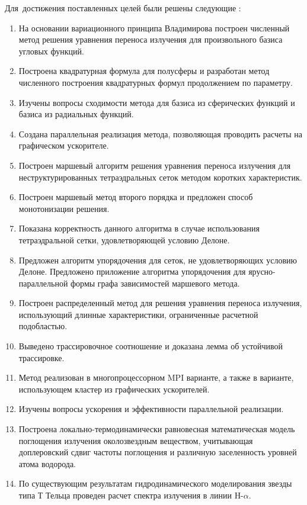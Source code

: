 Для~достижения поставленных целей были решены следующие {\tasks}:
\begin{enumerate}
  \item На основании вариационного принципа Владимирова построен численный метод решения уравнения переноса излучения для произвольного базиса угловых функций.
  \item Построена квадратурная формула для полусферы и разработан метод численного построения квадратурных формул продолжением по параметру.
  \item Изучены вопросы сходимости метода для базиса из сферических функций и базиса из радиальных функций.
  \item Создана параллельная реализация метода, позволяющая проводить расчеты на графическом ускорителе.
  
  \item Построен маршевый алгоритм решения уравнения переноса излучения для неструктурированных тетраэдральных сеток методом коротких характеристик.
  \item Построен маршевый метод второго порядка и предложен способ монотонизации решения.
  \item Показана корректность данного алгоритма в случае использования тетраэдральной сетки, удовлетворяющей условию Делоне.
  \item Предложен алгоритм упорядочения для сеток, не удовлетворяющих условию Делоне. Предложено приложение алгоритма упорядочения для ярусно-параллельной формы графа зависимостей маршевого метода.
  
  \item Построен распределенный метод для решения уравнения переноса излучения, использующий длинные характеристики, ограниченные расчетной подобластью.
  \item Выведено трассировочное соотношение и доказана лемма об устойчивой трассировке.
  \item Метод реализован в многопроцессорном MPI варианте, а также в варианте, использующем кластер из графических ускорителей.
  \item Изучены вопросы ускорения и эффективности параллельной реализации.
  
  \item Построена локально-термодинамически равновесная математическая модель поглощения излучения околозвездным веществом, учитывающая доплеровский сдвиг частоты поглощения и различную заселенность уровней атома водорода.
  \item По существующим результатам гидродинамического моделирования звезды типа Т Тельца проведен расчет спектра излучения в линии $\text{H-}\alpha$.
\end{enumerate}

